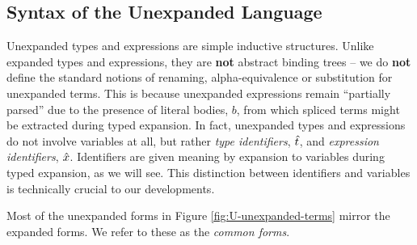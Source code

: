 \documentclass[acmsmall,review,anonymous]{acmart}\settopmatter{printfolios=true,printccs=false,printacmref=false}
\begin{document}
\subsection{Syntax of the Unexpanded Language}\label{sec:syntax-U}\label{sec:s-UL}
Unexpanded types and expressions are simple inductive structures. Unlike expanded types and expressions, they are \textbf{not} abstract binding trees -- we do \textbf{not} define the standard notions of renaming, alpha-equivalence or substitution for unexpanded terms. This is because unexpanded expressions remain ``partially parsed'' due to the presence of literal bodies, $b$, from which spliced terms might be extracted during typed expansion. In fact, unexpanded types and expressions do not involve variables at all, but rather \emph{type identifiers}, ${\hat{t}}$, and \emph{expression identifiers}, ${\hat x}$. Identifiers are given meaning by expansion to variables during typed expansion, as we will see. This distinction between identifiers and variables is technically crucial to our developments. %

Most of the unexpanded forms in Figure \ref{fig:U-unexpanded-terms}  mirror the expanded forms. We refer to these as the \emph{common forms}. %
\end{document}
